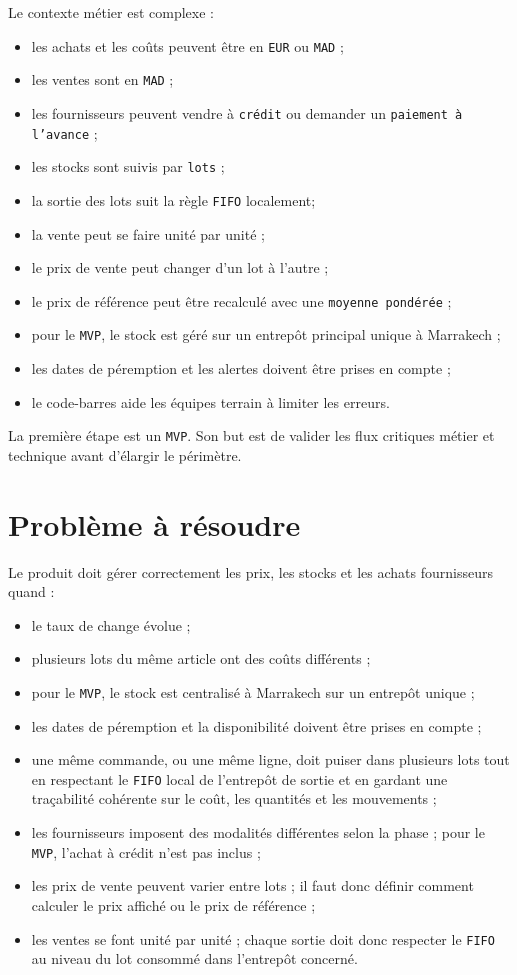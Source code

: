 \documentclass[11pt,a4paper]{scrreprt}
\newcommand{\code}[1]{\texttt{#1}}
\begin{document}
Le contexte métier est complexe :
\begin{itemize}
  \item les achats et les coûts peuvent être en \code{EUR} ou \code{MAD} ;
  \item les ventes sont en \code{MAD} ;
  \item les fournisseurs peuvent vendre à \code{crédit} ou demander un \code{paiement à l'avance} ;
  \item les stocks sont suivis par \code{lots} ;
  \item la sortie des lots suit la règle \code{FIFO} localement;
  \item la vente peut se faire unité par unité ;
  \item le prix de vente peut changer d'un lot à l'autre ;
  \item le prix de référence peut être recalculé avec une \code{moyenne pondérée} ;
  \item pour le \code{MVP}, le stock est géré sur un entrepôt principal unique à Marrakech ;
  \item les dates de péremption et les alertes doivent être prises en compte ;
  \item le code-barres aide les équipes terrain à limiter les erreurs.
\end{itemize}

La première étape est un \code{MVP}. Son but est de valider les flux critiques métier et technique avant d'élargir le périmètre.

\section{Problème à résoudre}
Le produit doit gérer correctement les prix, les stocks et les achats fournisseurs quand :
\begin{itemize}
  \item le taux de change évolue ;
  \item plusieurs lots du même article ont des coûts différents ;
  \item pour le \code{MVP}, le stock est centralisé à Marrakech sur un entrepôt unique ;
  \item les dates de péremption et la disponibilité doivent être prises en compte ;
  \item une même commande, ou une même ligne, doit puiser dans plusieurs lots tout en respectant le \code{FIFO} local de l'entrepôt de sortie et en gardant une traçabilité cohérente sur le coût, les quantités et les mouvements ;
  \item les fournisseurs imposent des modalités différentes selon la phase ; pour le \code{MVP}, l'achat à crédit n'est pas inclus ;
  \item les prix de vente peuvent varier entre lots ; il faut donc définir comment calculer le prix affiché ou le prix de référence ;
  \item les ventes se font unité par unité ; chaque sortie doit donc respecter le \code{FIFO} au niveau du lot consommé dans l'entrepôt concerné.
\end{itemize}
\end{document}

